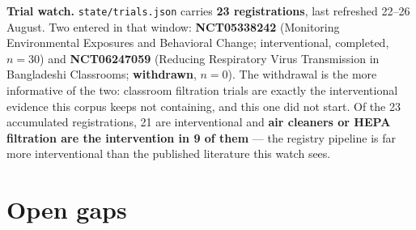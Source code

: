 \documentclass[10pt]{article}
\begin{document}
\vspace{1.2mm}
\textbf{Trial watch.} \texttt{state/trials.json} carries \textbf{23 registrations}, last
refreshed 22--26 August. Two entered in that window: \textbf{NCT05338242} (Monitoring
Environmental Exposures and Behavioral Change; interventional, completed, $n=30$) and
\textbf{NCT06247059} (Reducing Respiratory Virus Transmission in Bangladeshi Classrooms;
\textbf{withdrawn}, $n=0$). The withdrawal is the more informative of the two: classroom
filtration trials are exactly the interventional evidence this corpus keeps not
containing, and this one did not start. Of the 23 accumulated registrations, 21 are
interventional and \textbf{air cleaners or HEPA filtration are the intervention in 9 of
them} --- the registry pipeline is far more interventional than the published literature
this watch sees.

\vspace{3mm}
\section*{\sffamily\bfseries\color{Deep}Open gaps}
\vspace{-1.5mm}{\color{Teal}\rule{\linewidth}{1.1pt}}\vspace{2.5mm}
\end{document}
